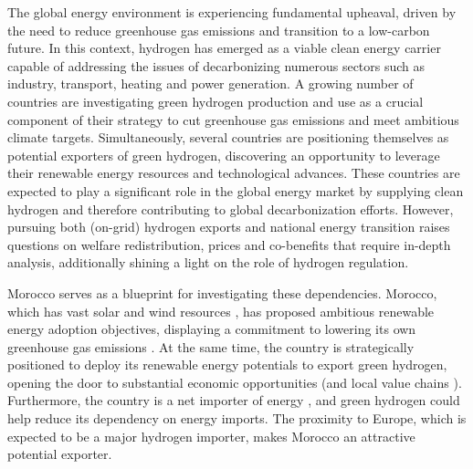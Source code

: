 






The global energy environment is experiencing fundamental upheaval, driven by the need to reduce greenhouse gas emissions and transition to a low-carbon future. In this context, hydrogen has emerged as a viable clean energy carrier capable of addressing the issues of decarbonizing numerous sectors such as industry, transport, heating and power generation. A growing number of countries are investigating green hydrogen production and use as a crucial component of their strategy to cut greenhouse gas emissions and meet ambitious climate targets.
Simultaneously, several countries are positioning themselves as potential exporters of green hydrogen, discovering an opportunity to leverage their renewable energy resources and technological advances. %
These countries are expected to play a significant role in the global energy market by supplying clean hydrogen and therefore contributing to global decarbonization efforts. However, pursuing both (on-grid) hydrogen exports and national energy transition raises questions on welfare redistribution, prices and co-benefits that require in-depth analysis, additionally shining a light on the role of hydrogen regulation.

Morocco serves as a blueprint for investigating these dependencies. Morocco, which has vast solar and wind resources \cite{Peters2023, Touili2018, Sterl2022}, has proposed ambitious renewable energy adoption objectives, displaying a commitment to lowering its own greenhouse gas emissions \cite{CAT2021}. At the same time, the country is strategically positioned to deploy its renewable energy potentials to export green hydrogen, opening the door to substantial economic opportunities (and local value chains \cite{Ersoy2022}). Furthermore, the country is a net importer of energy \cite{IEA2022}, and green hydrogen could help reduce its dependency on energy imports. The proximity to Europe, which is expected to be a major hydrogen importer, makes Morocco an attractive potential exporter. %


